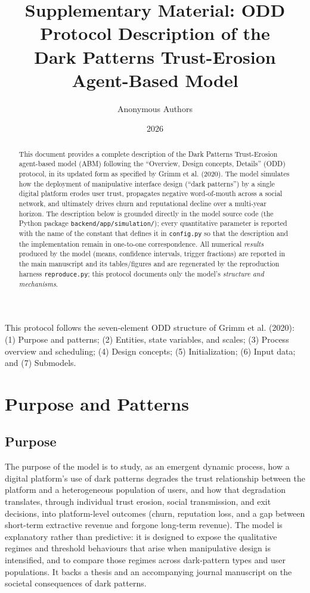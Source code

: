 \documentclass[11pt]{article}
\title{Supplementary Material: ODD Protocol Description of the\\
Dark Patterns Trust-Erosion Agent-Based Model}
\author{Anonymous Authors}
\date{2026}
\newcommand{\code}[1]{\texttt{#1}}
\begin{document}
\maketitle

\begin{abstract}
\noindent This document provides a complete description of the Dark Patterns
Trust-Erosion agent-based model (ABM) following the ``Overview, Design concepts,
Details'' (ODD) protocol, in its updated form as specified by
Grimm et al. (2020). The model simulates how the deployment of manipulative
interface design (``dark patterns'') by a single digital platform erodes user
trust, propagates negative word-of-mouth across a social network, and ultimately
drives churn and reputational decline over a multi-year horizon. The description
below is grounded directly in the model source code (the Python package
\code{backend/app/simulation/}); every quantitative parameter is reported with
the name of the constant that defines it in \code{config.py} so that the
description and the implementation remain in one-to-one correspondence.
All numerical \emph{results} produced by the model (means, confidence intervals,
trigger fractions) are reported in the main manuscript and its tables/figures and
are regenerated by the reproduction harness \code{reproduce.py}; this protocol
documents only the model's \emph{structure and mechanisms}.
\end{abstract}

\tableofcontents

\bigskip

This protocol follows the seven-element ODD structure of
Grimm et al. (2020): (1) Purpose and patterns; (2) Entities, state variables,
and scales; (3) Process overview and scheduling; (4) Design concepts;
(5) Initialization; (6) Input data; and (7) Submodels.

\section{Purpose and Patterns}
\label{sec:purpose}

\subsection{Purpose}

The purpose of the model is to study, as an emergent dynamic process, how a
digital platform's use of dark patterns degrades the trust relationship between
the platform and a heterogeneous population of users, and how that degradation
translates, through individual trust erosion, social transmission, and
exit decisions, into platform-level outcomes (churn, reputation loss, and a
gap between short-term extractive revenue and forgone long-term revenue). The
model is explanatory rather than predictive: it is designed to expose the
qualitative regimes and threshold behaviours that arise when manipulative design
is intensified, and to compare those regimes across dark-pattern types and user
populations. It backs a thesis and an accompanying journal manuscript on the
societal consequences of dark patterns.
\end{document}
